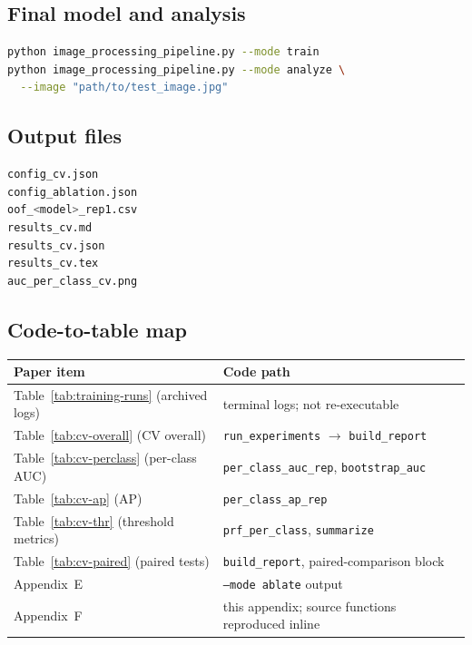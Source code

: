 \documentclass[11pt]{article}
\begin{document}
\subsection{Final model and analysis}
\begin{lstlisting}[language=bash,caption={Train the deployment model and run the survey interface.},label={lst:traincmd}]
python image_processing_pipeline.py --mode train
python image_processing_pipeline.py --mode analyze \
  --image "path/to/test_image.jpg"
\end{lstlisting}

\subsection{Output files}
\begin{lstlisting}[language=bash,caption={Files written under \texttt{results/}.},label={lst:outputs}]
config_cv.json
config_ablation.json
oof_<model>_rep1.csv
results_cv.md
results_cv.json
results_cv.tex
auc_per_class_cv.png
\end{lstlisting}

\subsection{Code-to-table map}
\begin{center}
\small
\begin{tabular}{ll}
\toprule
Paper item & Code path \\
\midrule
Table~\ref{tab:training-runs} (archived logs) & terminal logs; not re-executable \\
Table~\ref{tab:cv-overall} (CV overall) & \texttt{run\_experiments} $\rightarrow$ \texttt{build\_report} \\
Table~\ref{tab:cv-perclass} (per-class AUC) & \texttt{per\_class\_auc\_rep}, \texttt{bootstrap\_auc} \\
Table~\ref{tab:cv-ap} (AP) & \texttt{per\_class\_ap\_rep} \\
Table~\ref{tab:cv-thr} (threshold metrics) & \texttt{prf\_per\_class}, \texttt{summarize} \\
Table~\ref{tab:cv-paired} (paired tests) & \texttt{build\_report}, paired-comparison block \\
Appendix~E & \texttt{--mode ablate} output \\
Appendix~F & this appendix; source functions reproduced inline \\
\bottomrule
\end{tabular}
\end{center}
\end{document}

